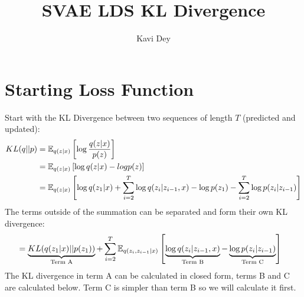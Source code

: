 \documentclass[12pt]{article}
\title{SVAE LDS KL Divergence}
\author{Kavi Dey}
\begin{document}
\maketitle

\section{Starting Loss Function}
Start with the KL Divergence between two sequences of length $T$ (predicted and updated):
\begin{align}
    KL(q||p) &= \mathbb{E}_{q(z|x)} \left[\log \frac{q(z|x)}{p(z)} \right] \\
    &= \mathbb{E}_{q(z|x)} \left[ \log q(z|x) - log p(z) \right] \\
    &= \mathbb{E}_{q(z|x)} \left[ \log q(z_1|x) + \sum_{i=2}^T \log q(z_i | z_{i-1}, x) - \log p(z_1) - \sum_{i=2}^T \log p(z_i|z_{i-1})\right]
\end{align}
The terms outside of the summation can be separated and form their own KL divergence:
\begin{align}
    &= \underbrace{KL(q(z_1|x)||p(z_1))}_\text{Term A} + \sum_{i=2}^{T} \mathbb{E}_{q(z_i,z_{i-1}|x)} \left[ \underbrace{\log q(z_i | z_{i-1}, x)}_{\text{Term B}} - \underbrace{\log p(z_i| z_{i-1})}_\text{Term C} \right]
\end{align}
The KL divergence in term A can be calculated in closed form, terms B and C are calculated below. Term C is simpler than term B so we will calculate it first.
\end{document}
